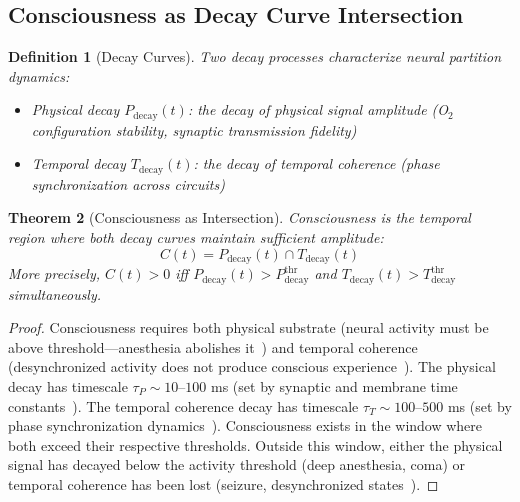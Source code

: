 \documentclass[10pt,twocolumn]{article}
\newtheorem{theorem}{Theorem}[section]
\newtheorem{definition}[theorem]{Definition}
\theoremstyle{remark}
\newcommand{\Pdecay}{P_{\mathrm{decay}}}
\newcommand{\Tdecay}{T_{\mathrm{decay}}}
\begin{document}
\subsection{Consciousness as Decay Curve Intersection}

\begin{definition}[Decay Curves]
\label{def:decay}
Two decay processes characterize neural partition dynamics:
\begin{itemize}[noitemsep]
\item \emph{Physical decay} $\Pdecay(t)$: the decay of physical signal amplitude (O$_2$ configuration stability, synaptic transmission fidelity)~\cite{hodgkin1952quantitative}
\item \emph{Temporal decay} $\Tdecay(t)$: the decay of temporal coherence (phase synchronization across circuits)~\cite{varela2001brainweb,lachaux1999measuring}
\end{itemize}
\end{definition}

\begin{theorem}[Consciousness as Intersection]
\label{thm:consciousness}
Consciousness is the temporal region where both decay curves maintain sufficient amplitude:
\begin{equation}
C(t) = \Pdecay(t) \cap \Tdecay(t)
\label{eq:consciousness}
\end{equation}
More precisely, $C(t) > 0$ iff $\Pdecay(t) > \Pdecay^{\mathrm{thr}}$ and $\Tdecay(t) > \Tdecay^{\mathrm{thr}}$ simultaneously.
\end{theorem}

\begin{proof}
Consciousness requires both physical substrate (neural activity must be above threshold---anesthesia abolishes it~\cite{dehaene2014consciousness}) and temporal coherence (desynchronized activity does not produce conscious experience~\cite{tononi2016integrated}). The physical decay has timescale $\tau_P \sim 10$--$100$ ms (set by synaptic and membrane time constants~\cite{hodgkin1952quantitative}). The temporal coherence decay has timescale $\tau_T \sim 100$--$500$ ms (set by phase synchronization dynamics~\cite{varela2001brainweb}). Consciousness exists in the window where both exceed their respective thresholds. Outside this window, either the physical signal has decayed below the activity threshold (deep anesthesia, coma) or temporal coherence has been lost (seizure, desynchronized states~\cite{steriade1993thalamocortical}).
\end{proof}
\end{document}
